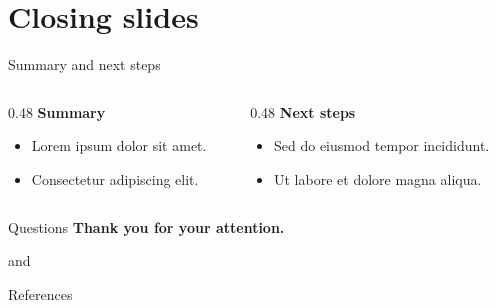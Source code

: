 \section{Closing slides}

\begin{frame}[t]{Summary and next steps}
    \begin{columns}[T,onlytextwidth]
        \begin{column}{0.48\textwidth}
            \textbf{Summary}
            \begin{itemize}
                \item Lorem ipsum dolor sit amet.
                \item Consectetur adipiscing elit.
            \end{itemize}
        \end{column}
        \begin{column}{0.48\textwidth}
            \textbf{Next steps}
            \begin{itemize}
                \item Sed do eiusmod tempor incididunt.
                \item Ut labore et dolore magna aliqua.
            \end{itemize}
        \end{column}
    \end{columns}
\end{frame}

\begin{frame}{Questions}
    \centering
    \textbf{Thank you for your attention.}
    \par\bigskip
    \authoronename{} and \authortwoname
    \par\medskip
    {\small\authoroneemail\par\smallskip\authortwoemail\par}
\end{frame}

\begin{frame}[t,allowframebreaks]{References}
    \printbibliography[heading=none]
\end{frame}

